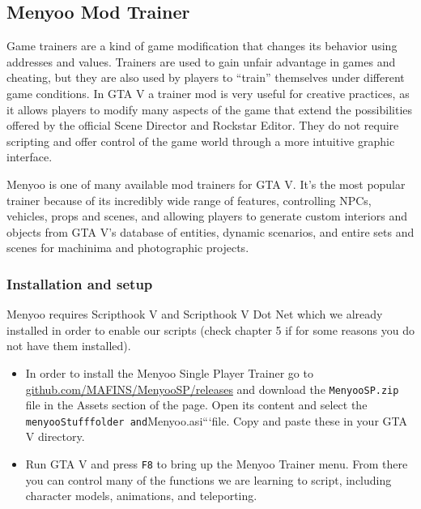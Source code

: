 \documentclass[
  openany]{book}
\begin{document}
\hypertarget{menyoo-mod-trainer}{%
\subsection*{Menyoo Mod Trainer}\label{menyoo-mod-trainer}}

Game trainers are a kind of game modification that changes its behavior using addresses and values. Trainers are used to gain unfair advantage in games and cheating, but they are also used by players to ``train'' themselves under different game conditions. In GTA V a trainer mod is very useful for creative practices, as it allows players to modify many aspects of the game that extend the possibilities offered by the official Scene Director and Rockstar Editor. They do not require scripting and offer control of the game world through a more intuitive graphic interface.

Menyoo is one of many available mod trainers for GTA V. It's the most popular trainer because of its incredibly wide range of features, controlling NPCs, vehicles, props and scenes, and allowing players to generate custom interiors and objects from GTA V's database of entities, dynamic scenarios, and entire sets and scenes for machinima and photographic projects.

\hypertarget{installation-and-setup}{%
\subsubsection*{Installation and setup}\label{installation-and-setup}}

Menyoo requires Scripthook V and Scripthook V Dot Net which we already installed in order to enable our scripts (check chapter 5 if for some reasons you do not have them installed).

\begin{itemize}
\item
  In order to install the Menyoo Single Player Trainer go to \href{https://github.com/MAFINS/MenyooSP/releases}{github.com/MAFINS/MenyooSP/releases} and download the \texttt{MenyooSP.zip} file in the Assets section of the page. Open its content and select the \texttt{menyooStuff\textasciigrave{}\textasciigrave{}folder\ and}Menyoo.asi```file. Copy and paste these in your GTA V directory.
\item
  Run GTA V and press \texttt{F8} to bring up the Menyoo Trainer menu. From there you can control many of the functions we are learning to script, including character models, animations, and teleporting.
\end{itemize}
\end{document}
